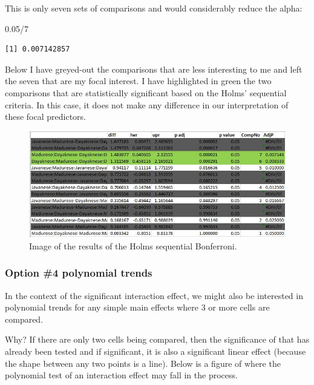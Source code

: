 \documentclass[
  11pt,
]{book}
\newenvironment{Shaded}{\begin{snugshade}}{\end{snugshade}}
\newcommand{\DecValTok}[1]{\textcolor[rgb]{0.00,0.00,0.81}{#1}}
\newcommand{\FloatTok}[1]{\textcolor[rgb]{0.00,0.00,0.81}{#1}}
\newcommand{\SpecialCharTok}[1]{\textcolor[rgb]{0.00,0.00,0.00}{#1}}
\begin{document}
This is only seven sets of comparisons and would considerably reduce the alpha:

\begin{Shaded}
\begin{Highlighting}[]
\FloatTok{0.05}\SpecialCharTok{/}\DecValTok{7}
\end{Highlighting}
\end{Shaded}

\begin{verbatim}
[1] 0.007142857
\end{verbatim}

Below I have greyed-out the comparisons that are less interesting to me and left the seven that are my focal interest. I have highlighted in green the two comparisons that are statistically significant based on the Holms' sequential criteria. In this case, it does not make any difference in our interpretation of these focal predictors.

\begin{figure}
\centering
\includegraphics{images/factorial/HolmsSelect.jpg}
\caption{Image of the results of the Holms sequential Bonferroni.}
\end{figure}

\hypertarget{option-4-polynomial-trends}{%
\subsubsection{Option \#4 polynomial trends}\label{option-4-polynomial-trends}}

In the context of the significant interaction effect, we might also be interested in polynomial trends for any simple main effects where 3 or more cells are compared.

Why? If there are only two cells being compared, then the significance of that has already been tested and if significant, it is also a significant linear effect (because the shape between any two points is a line). Below is a figure of where the polynomial test of an interaction effect may fall in the process.
\end{document}
